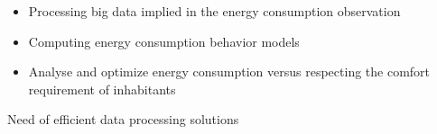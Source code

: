 \begin{itemize}
\item Processing big data implied in the energy consumption observation 
\item Computing energy consumption behavior models
\item Analyse and optimize energy consumption versus respecting the comfort requirement of inhabitants
\end{itemize}

Need of efficient data processing solutions
